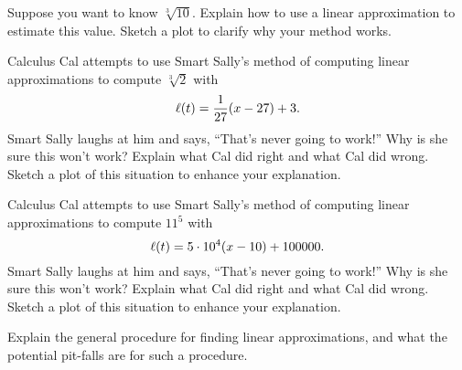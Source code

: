 \documentclass{ximera}
\begin{document}
\begin{problem}
Suppose you want to know $\sqrt[3]{10}$. Explain how to use a linear
approximation to estimate this value. Sketch a plot to clarify why
your method works.
\end{problem}


\begin{problem}
Calculus Cal attempts to use Smart Sally's method of computing linear
approximations to compute $\sqrt[3]{2}$ with
\[
\ell(t) = \frac{1}{27}(x-27)+3.
\] 
Smart Sally laughs at him and says, ``That's never going to work!''
Why is she sure this won't work? Explain what Cal did right and what
Cal did wrong. Sketch a plot of this situation to enhance your
explanation.
\end{problem}

\begin{problem}
Calculus Cal attempts to use Smart Sally's method of computing linear
approximations to compute $11^5$ with
\[
\ell(t) = 5\cdot 10^4(x-10)+100000.
\] 
Smart Sally laughs at him and says, ``That's never going to work!''
Why is she sure this won't work? Explain what Cal did right and what
Cal did wrong. Sketch a plot of this situation to enhance your
explanation.
\end{problem}

\begin{problem}
Explain the general procedure for finding linear approximations, and
what the potential pit-falls are for such a procedure.
\end{problem}






\end{document}
